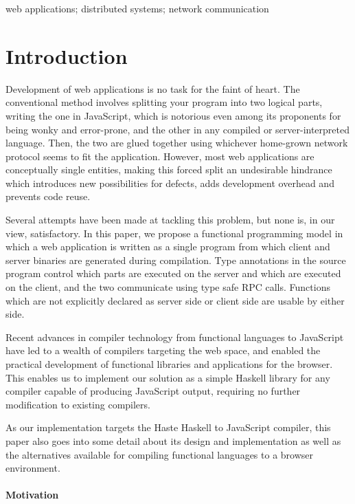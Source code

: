 \documentclass[preprint]{sigplanconf}
\begin{document}
%
\keywords
web applications; distributed systems; network communication

\section{Introduction}

Development of web applications is no task for the faint of heart.
The conventional method involves splitting your program into two logical parts,
writing the one in JavaScript, which is notorious even among its proponents for
being wonky and error-prone, and the other in any compiled or
server-interpreted language. Then, the two are glued together using whichever
home-grown network protocol seems to fit the application. However, most web
applications are conceptually single entities, making this forced split an
undesirable hindrance which introduces new possibilities for defects, adds
development overhead and prevents code reuse.

Several attempts have been made at tackling this problem, but none is, in our
view, satisfactory. In this paper, we propose a functional programming model in
which a web application is written as a single program from which client and
server binaries are generated during compilation. Type annotations in the source
program control which parts are executed on the server and which are executed
on the client, and the two communicate using type safe RPC calls. Functions
which are not explicitly declared as server side or client side are usable by
either side.

Recent advances in compiler technology from functional languages to JavaScript
have led to a wealth of compilers targeting the web space, and enabled the
practical development of functional libraries and applications for
the browser. This enables us to implement our solution as a simple Haskell
library for any compiler capable of producing JavaScript output, requiring no
further modification to existing compilers.

As our implementation targets the Haste Haskell to JavaScript compiler, this
paper also goes into some detail about its design and implementation as well
as the alternatives available for compiling functional languages to a browser
environment.

\paragraph{Motivation}
\end{document}
